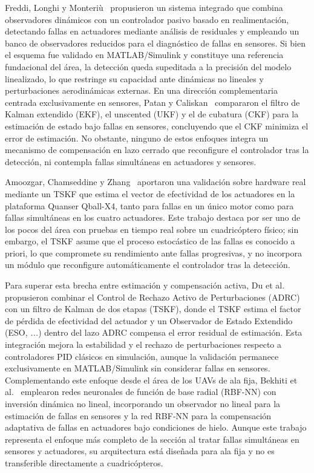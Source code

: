 \noindent Freddi, Longhi y Monteriù~\cite{freddi2019} propusieron un sistema integrado que combina observadores dinámicos con un controlador pasivo basado en realimentación, detectando fallas en actuadores mediante análisis de residuales y empleando un banco de observadores reducidos para el diagnóstico de fallas en sensores. Si bien el esquema fue validado en MATLAB/Simulink y constituye una referencia fundacional del área, la detección queda supeditada a la precisión del modelo linealizado, lo que restringe su capacidad ante dinámicas no lineales y perturbaciones aerodinámicas externas. En una dirección complementaria centrada exclusivamente en sensores, Patan y Caliskan~\cite{patan2022} compararon el filtro de Kalman extendido (EKF), el unscented (UKF) y el de cubatura (CKF) para la estimación de estado bajo fallas en sensores, concluyendo que el CKF minimiza el error de estimación. No obstante, ninguno de estos enfoques integra un mecanismo de compensación en lazo cerrado que reconfigure el controlador tras la detección, ni contempla fallas simultáneas en actuadores y sensores.

Amoozgar, Chamseddine y Zhang~\cite{amoozgar2013} aportaron una validación sobre hardware real mediante un TSKF que estima el vector de efectividad de los actuadores en la plataforma Quanser Qball-X4, tanto para fallas en un único motor como para fallas simultáneas en los cuatro actuadores. Este trabajo destaca por ser uno de los pocos del área con pruebas en tiempo real sobre un cuadricóptero físico; sin embargo, el TSKF asume que el proceso estocástico de las fallas es conocido a priori, lo que compromete su rendimiento ante fallas progresivas, y no incorpora un módulo que reconfigure automáticamente el controlador tras la detección.

\noindent Para superar esta brecha entre estimación y compensación activa, Du et al.\cite{du2023} propusieron combinar el Control de Rechazo Activo de Perturbaciones (ADRC) con un filtro de Kalman de dos etapas (TSKF), donde el TSKF estima el factor de pérdida de efectividad del actuador y un Observador de Estado Extendido (ESO, \textit{...}) dentro del lazo ADRC compensa el error residual de estimación. Esta integración mejora la estabilidad y el rechazo de perturbaciones respecto a controladores PID clásicos en simulación, aunque la validación permanece exclusivamente en MATLAB/Simulink sin considerar fallas en sensores. Complementando este enfoque desde el área de los UAVs de ala fija, Bekhiti et al.~\cite{bekhiti2025} emplearon redes neuronales de función de base radial (RBF-NN) con inversión dinámica no lineal, incorporando un observador no lineal para la estimación de fallas en sensores y la red RBF-NN para la compensación adaptativa de fallas en actuadores bajo condiciones de hielo. Aunque este trabajo representa el enfoque más completo de la sección al tratar fallas simultáneas en sensores y actuadores, su arquitectura está diseñada para ala fija y no es transferible directamente a cuadricópteros.


